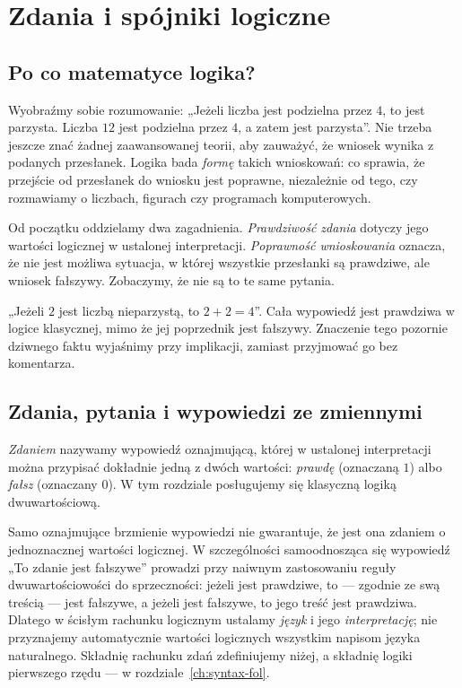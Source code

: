 \chapter{Zdania i spójniki logiczne}\label{ch:propositional}

\section{Po co matematyce logika?}\label{sec:logic-motivation}
Wyobraźmy sobie rozumowanie: „Jeżeli liczba jest podzielna przez $4$,
to jest parzysta. Liczba $12$ jest podzielna przez $4$, a zatem jest
parzysta”. Nie trzeba jeszcze znać żadnej zaawansowanej teorii, aby
zauważyć, że wniosek wynika z podanych przesłanek. Logika bada
\emph{formę} takich wnioskowań: co sprawia, że przejście od przesłanek
do wniosku jest poprawne, niezależnie od tego, czy rozmawiamy o
liczbach, figurach czy programach komputerowych.

Od początku oddzielamy dwa zagadnienia. \emph{Prawdziwość zdania}
dotyczy jego wartości logicznej w ustalonej interpretacji. \emph{Poprawność wnioskowania} oznacza, że nie jest
możliwa sytuacja, w której wszystkie przesłanki są prawdziwe,
ale wniosek fałszywy. Zobaczymy, że nie są to te same pytania.

\begin{przyklad}
„Jeżeli $2$ jest liczbą nieparzystą, to $2+2=4$”. Cała wypowiedź
jest prawdziwa w logice klasycznej, mimo że jej poprzednik jest
fałszywy. Znaczenie tego pozornie dziwnego faktu wyjaśnimy przy
implikacji, zamiast przyjmować go bez komentarza.
\end{przyklad}

\section{Zdania, pytania i wypowiedzi ze zmiennymi}\label{sec:statements}
\begin{definicja}\label{def:statement}
\emph{Zdaniem} nazywamy wypowiedź oznajmującą, której w ustalonej
interpretacji można przypisać dokładnie jedną z dwóch wartości:
\emph{prawdę} (oznaczaną $1$) albo \emph{fałsz} (oznaczany $0$).
W tym rozdziale posługujemy się klasyczną logiką dwuwartościową.
\end{definicja}

\begin{uwaga}\label{rem:statement-scope-xli}
Samo oznajmujące brzmienie wypowiedzi nie gwarantuje, że jest
ona zdaniem o jednoznacznej wartości logicznej. W szczególności
samoodnosząca się wypowiedź „To zdanie jest fałszywe” prowadzi
przy naiwnym zastosowaniu reguły dwuwartościowości do sprzeczności:
jeżeli jest prawdziwe, to --- zgodnie ze swą treścią --- jest
fałszywe, a jeżeli jest fałszywe, to jego treść jest prawdziwa.
Dlatego w ścisłym rachunku logicznym ustalamy \emph{język}
i jego \emph{interpretację}; nie przyznajemy automatycznie wartości
logicznych wszystkim napisom języka naturalnego. Składnię
rachunku zdań zdefiniujemy niżej, a składnię logiki pierwszego
rzędu --- w rozdziale~\ref{ch:syntax-fol}.
\end{uwaga}

